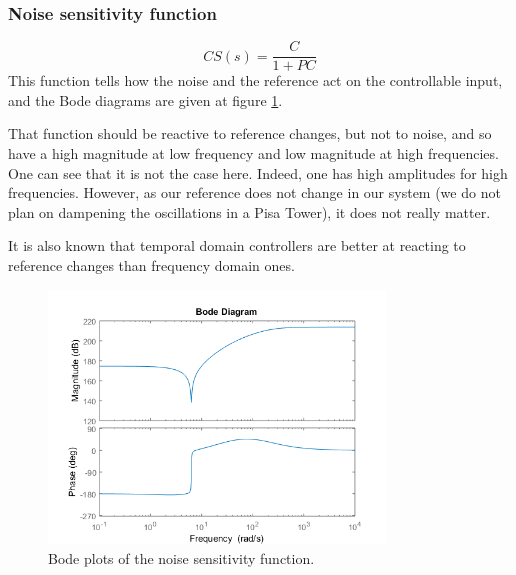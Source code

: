 \subsubsection{Noise sensitivity function}
$$
CS(s) = \dfrac{C}{1 + PC}
$$
This function tells how the noise and the reference act on the controllable input, and the Bode diagrams are given at figure \ref{fig:noise-sensitivity}.\par
That function should be reactive to reference changes, but not to noise, and so have a high magnitude at low frequency and low magnitude at high frequencies. One can see that it is not the case here. Indeed, one has high amplitudes for high frequencies. However, as our reference does not change in our system (we do not plan on dampening the oscillations in a Pisa Tower), it does not really matter.\par
It is also known that temporal domain controllers are better at reacting to reference changes than frequency domain ones.
\begin{figure}[H]
    \centering
    \includegraphics[width=0.8\textwidth]{resources/png/noise-sensitivity.png}
    \caption{Bode plots of the noise sensitivity function.}
    \label{fig:noise-sensitivity}
\end{figure}

